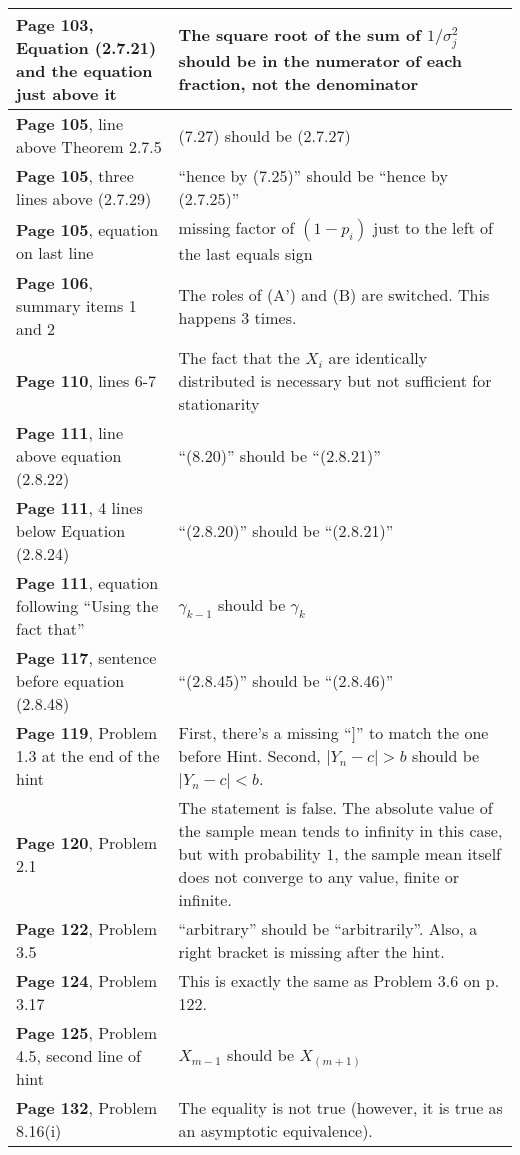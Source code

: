\documentclass[10pt, a4paper]{article}
\begin{document}
\begin{longtable}{|R{.40\textwidth}|R{.55\textwidth}|}
\textbf{Page 103}, Equation (2.7.21) and the equation just above it & The square root of the sum of $1/\sigma_j^2$ should be in the numerator of each fraction, not the denominator \\ \hline
\textbf{Page 105}, line above Theorem 2.7.5 & (7.27) should be (2.7.27) \\ \hline
\textbf{Page 105}, three lines above (2.7.29) & ``hence by (7.25)'' should be ``hence by (2.7.25)'' \\ \hline
\textbf{Page 105}, equation on last line & missing factor of $(1-p_i)$ just to the left of the last equals sign \\ \hline
\textbf{Page 106}, summary items 1 and 2 & The roles of (A') and (B) are switched. This happens 3 times. \\ \hline
\textbf{Page 110}, lines 6-7 & The fact that the $X_i$ are identically distributed is necessary but not sufficient for stationarity \\ \hline
\textbf{Page 111}, line above equation (2.8.22) & ``(8.20)'' should be ``(2.8.21)'' \\ \hline
\textbf{Page 111}, 4 lines below Equation (2.8.24) & ``(2.8.20)'' should be ``(2.8.21)'' \\ \hline
\textbf{Page 111}, equation following ``Using the fact that'' & $\gamma_{k-1}$ should be $\gamma_k$ \\ \hline
\textbf{Page 117}, sentence before equation (2.8.48) & “(2.8.45)” should be “(2.8.46)” \\ \hline
\textbf{Page 119}, Problem 1.3 at the end of the hint & First, there's a missing ``$]$'' to match the one before Hint. Second, $|Y_n-c| > b$ should be $|Y_n-c| < b$. \\ \hline
\textbf{Page 120}, Problem 2.1 & The statement is false. The absolute value of the sample mean tends to infinity in this case, but with probability $1$, the sample mean itself does not converge to any value, finite or infinite. \\ \hline
\textbf{Page 122}, Problem 3.5 & ``arbitrary'' should be ``arbitrarily''. Also, a right bracket is missing after the hint. \\ \hline
\textbf{Page 124}, Problem 3.17 & This is exactly the same as Problem 3.6 on p. 122. \\ \hline
\textbf{Page 125}, Problem 4.5, second line of hint & $X_{m-1}$ should be $X_{(m+1)}$ \\ \hline
\textbf{Page 132}, Problem 8.16(i) & The equality is not true (however, it is true as an asymptotic equivalence). \\ \hline

\end{longtable}
\end{document}
